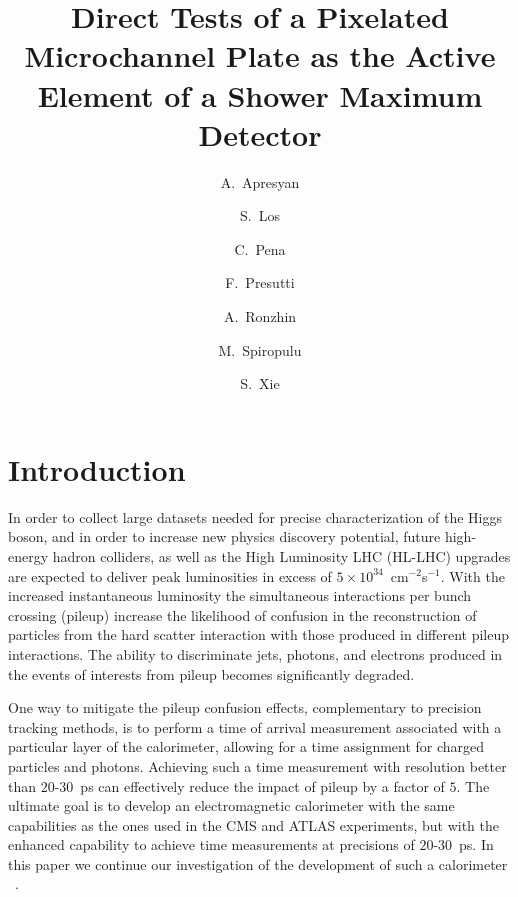 \documentclass[12pt]{article}
\title{Direct Tests of a Pixelated Microchannel Plate as the Active Element of a
Shower Maximum Detector}
\author[1]{A.~Apresyan}
\author[2]{S.~Los}
\author[1]{C.~Pena}
\author[1]{F.~Presutti}
\author[2]{A.~Ronzhin}
\author[1]{M.~Spiropulu}
\author[1]{S.~Xie}
\affil[1]{California Institute of Technology, Pasadena, CA, USA}
\affil[2]{Fermi National Accelerator Laboratory, Batavia, IL, USA}
\date{}
\begin{document}
\linenumbers

\maketitle
{}




\section{Introduction}

In order to collect large datasets needed for precise characterization of the
Higgs boson, and in order to increase new physics discovery potential, future
high-energy hadron colliders, as well as the High Luminosity LHC (HL-LHC)
upgrades are expected to deliver peak luminosities in excess of $5\times
10^{34}$~cm$^{-2}$s$^{-1}$. With the increased instantaneous luminosity the
simultaneous interactions per bunch crossing (pileup) increase the likelihood of
confusion in the reconstruction of particles from the hard scatter interaction
with those produced in different pileup interactions. The ability to
discriminate jets, photons, and electrons produced in the events of interests
from pileup becomes significantly degraded. 

One way to mitigate the pileup confusion effects, complementary to precision tracking 
methods, is to perform a time of arrival measurement associated with a particular layer of the
calorimeter, allowing for a time assignment for charged particles and photons.
Achieving such a time measurement with resolution better than $20$-$30$~ps
can effectively reduce the impact of pileup by a factor of $5$. The ultimate 
goal is to develop an electromagnetic calorimeter with the same capabilities as 
the ones used in the CMS and ATLAS experiments, but with the enhanced capability 
to achieve time measurements at precisions of $20$-$30$~ps.
In this paper we continue our investigation of the development of such a calorimeter
~\cite{Anderson:2015gha,MCPFastCaloNIMA,Ronzhin:2015pba,Ronzhin2015288}. 
\end{document}
